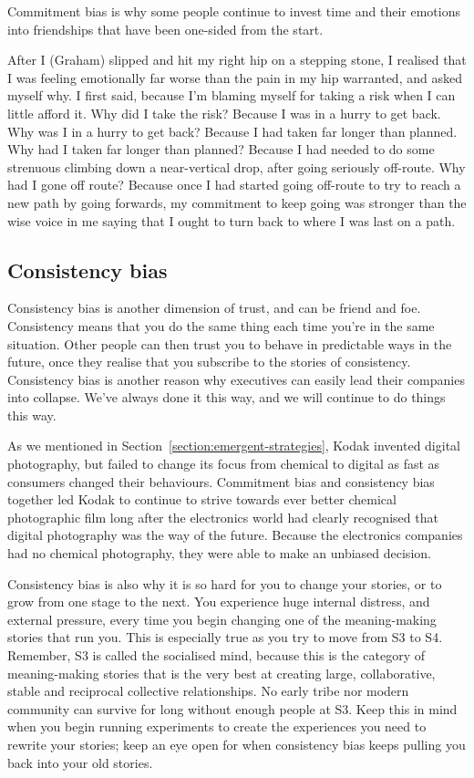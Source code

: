 Commitment bias is why some people continue to invest time and their emotions into friendships that have been one-sided from the start.


\begin{longstoryblock}
After I (Graham) slipped and hit my right hip on a stepping stone, I realised that I was feeling emotionally far worse than the pain in my hip warranted, and asked myself why. I first said, because I'm blaming myself for taking a risk when I can little afford it. Why did I take the risk? Because I was in a hurry to get back. Why was I in a hurry to get back? Because I had taken far longer than planned. Why had I taken far longer than planned? Because I had needed to do some strenuous climbing down a near-vertical drop, after going seriously off-route. Why had I gone off route? Because once I had started going off-route to try to reach a new path by going forwards, my commitment to keep going was stronger than the wise voice in me saying that I ought to turn back to where I was last on a path.
\end{longstoryblock}
\subsection{Consistency bias}
Consistency bias is another dimension of trust, and can be friend and foe. Consistency means that you do the same thing each time you're in the same situation. Other people can then trust you to behave in predictable ways in the future, once they realise that you subscribe to the stories of consistency. Consistency bias is another reason why executives can easily lead their companies into collapse. We've always done it this way, and we will continue to do things this way.


As we mentioned in Section~\ref{section:emergent-strategies}, Kodak  invented digital photography, but failed to change its focus from chemical to digital as fast as consumers changed their behaviours. Commitment bias and consistency bias together led Kodak to continue to strive towards ever better chemical photographic film long after the electronics world had clearly recognised that digital photography was the way of the future. Because the electronics companies had no chemical photography, they were able to make an unbiased decision.


Consistency bias is also why it is so hard for you to change your stories, or to grow from one stage to the next. You experience huge internal distress, and external pressure, every time you begin changing one of the meaning\hyp{}making stories that run you. This is especially true as you try to move from S3 to S4. Remember, S3 is called the socialised mind, because this is the category of meaning\hyp{}making stories that is the very best at creating large, collaborative, stable and reciprocal collective relationships. No early tribe nor modern community can survive for long without enough people at S3. Keep this in mind when you begin running experiments to create the experiences you need to rewrite your stories; keep an eye open for when consistency bias keeps pulling you back into your old stories.


